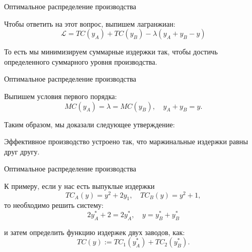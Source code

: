 \documentclass{beamer}
\begin{document}
\begin{frame}{Оптимальное распределение производства}

Чтобы ответить на этот вопрос, выпишем лагранжиан:
$$ \mathcal{L} = TC(y_A) + TC(y_B) - \lambda (y_A + y_B - y)$$

То есть мы минимизируем суммарные издержки так, чтобы достичь определенного суммарного уровня производства.

\end{frame}

\begin{frame}{Оптимальное распределение производства}

Выпишем условия первого порядка:
$$ MC(y_A) = \lambda = MC(y_B), \quad y_A + y_B = y.$$

Таким образом, мы доказали следующее утверждение:
\begin{lemma}
Эффективное производство устроено так, что маржинальные издержки равны друг другу.
\end{lemma}

\end{frame}

\begin{frame}{Оптимальное распределение производства}

К примеру, если у нас есть выпуклые издержки $$TC_A(y) = y^2 + 2 y_1, \quad TC_B(y) = y^2 + 1,$$ то необходимо решить систему:
$$ 2y_A^{\ast} + 2 = 2 y_A^{\ast}, \quad y = y_B^{\ast} + y_B^{\ast}$$

и затем определить функцию издержек двух заводов, как:
$$ TC(y) := TC_1(y_A^{\ast}) + TC_2(y_B^{\ast}).$$

\end{frame}
\end{document}
